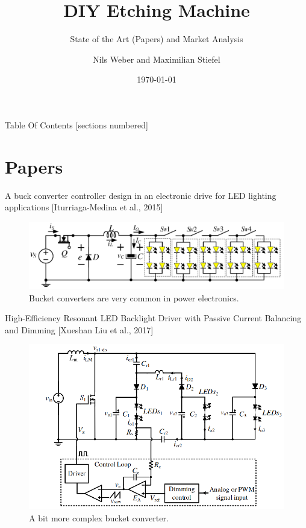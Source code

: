 \documentclass[apectratio=169]{beamer}
\title{DIY Etching Machine}
\subtitle{State of the Art (Papers) and Market Analysis}
\date{\today}
\author{Nils Weber and Maximilian Stiefel}
\institute{Uppsala University}
\begin{document}
  \maketitle

\begin{frame}{Table Of Contents}
  [sections numbered]
  \tableofcontents[hideallsubsections]
\end{frame}

\section{Papers}

\begin{frame}{A buck converter controller design in an electronic drive for LED lighting applications [Iturriaga-Medina et al., 2015]}
  \begin{figure}
    \centering
    \includegraphics[scale = 0.42]{./fig/paper1}
    \caption{Bucket converters are very common in power electronics.}
  \end{figure}	
\end{frame}

\begin{frame}{High-Efficiency Resonant LED Backlight Driver with Passive Current Balancing and Dimming [Xueshan Liu et al., 2017]}
  \begin{figure}
    \centering
    \includegraphics[scale = 0.42]{./fig/paper3}
    \caption{A bit more complex bucket converter.}
  \end{figure}	
\end{frame}
\end{document}
